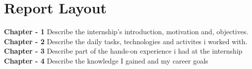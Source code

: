 \section{Report Layout}

\textbf{Chapter - 1} Describe the internship's introduction, motivation and, objectives.\newline
\textbf{Chapter - 2} Describe the daily tasks, technologies and
activites i worked with.\newline
\textbf{Chapter - 3}  Describe part of the hands-on experience i had at the internship\newline
\textbf{Chapter - 4}  Describe the knowledge I gained and my career goals\newline


